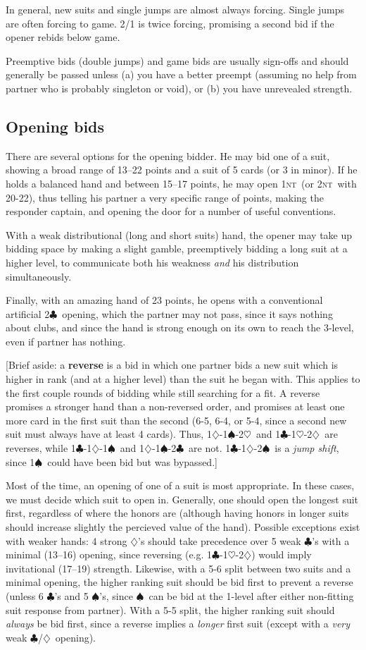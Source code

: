 \documentclass[11pt]{article}
\def\C{$\clubsuit$}
\def\D{$\diamondsuit$}
\def\H{$\heartsuit$}
\def\S{$\spadesuit$}
\def\NT{\textsc{nt}}
\begin{document}
In general, new suits and single jumps are almost always forcing.  
Single jumps are often forcing to game.  2/1 is twice forcing, promising
a second bid if the opener rebids below game.

Preemptive bids (double jumps) and game bids are usually sign-offs and
should generally be passed unless (a) you have a better preempt
(assuming no help from partner who is probably singleton or void), or
(b) you have unrevealed strength.

\subsection{Opening bids}
There are several options for the opening bidder.  He may bid one of a
suit, showing a broad range of 13--22 points and a suit of 5 cards (or
3 in minor).  If he holds a balanced hand and between 15--17 points,
he may open 1\NT\ (or 2\NT\ with 20-22), thus telling his partner a very
specific range of points, making the responder captain, and opening
the door for a number of useful conventions.

With a weak distributional (long and short suits) hand, 
the opener may take up bidding space by making a slight gamble, 
preemptively bidding a long suit at a higher level, to communicate
both his weakness \emph{and} his distribution simultaneously.

Finally, with an amazing hand of 23 points, he opens with a conventional
artificial 2\C\ opening, which the partner may not pass, since it
says nothing about clubs, and since the hand is strong enough on its
own to reach the 3-level, even if partner has nothing.

[Brief aside: a \textbf{reverse} is a bid in which one partner bids a
new suit which is higher in rank (and at a higher level) than the suit
he began with.  This applies to the first couple rounds of bidding
while still searching for a fit.  A reverse promises a stronger hand
than a non-reversed order, and promises at least one more card in the
first suit than the second (6-5, 6-4, or 5-4, since a second new suit
must always have at least 4 cards).  Thus, 1\D-1\S-2\H\ and 1\C-1\H-2\D\ 
are reverses, while 1\C-1\D-1\S\ and 1\D-1\S-2\C\ are not.  1\C-1\D-2\S\ 
is a \emph{jump shift}, since 1\S\ could have been bid but was bypassed.]

Most of the time, an opening of one of a suit is most appropriate.
In these cases, we must decide which suit to open in.  Generally, one
should open the longest suit first, regardless of where the honors are
(although having honors in longer suits should increase slightly the
percieved value of the hand).  Possible exceptions exist with weaker
hands: 4 strong \D's should take precedence over 5 weak \C's with a
minimal (13--16) opening, since reversing (e.g. 1\C-1\H-2\D) would imply
invitational (17--19) strength.  Likewise, with a 5-6 split between
two suits and a minimal opening, the higher ranking suit should be
bid first to prevent a reverse (unless 6 \C's and 5 \S's, since \S\ can
be bid at the 1-level after either non-fitting suit response from partner).
With a 5-5 split, the higher ranking suit should \emph{always} be bid first,
since a reverse implies a \emph{longer} first suit (except with a \emph{very}
weak \C/\D\ opening).
\end{document}
